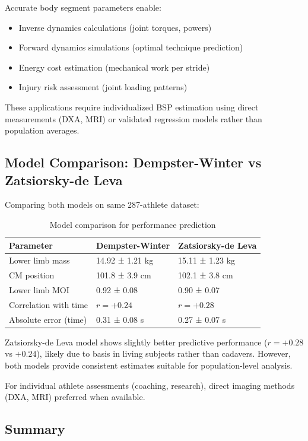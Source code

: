 Accurate body segment parameters enable:
\begin{itemize}
    \item Inverse dynamics calculations (joint torques, powers)
    \item Forward dynamics simulations (optimal technique prediction)
    \item Energy cost estimation (mechanical work per stride)
    \item Injury risk assessment (joint loading patterns)
\end{itemize}

These applications require individualized BSP estimation using direct measurements (DXA, MRI) or validated regression models rather than population averages.

\subsection{Model Comparison: Dempster-Winter vs Zatsiorsky-de Leva}

Comparing both models on same 287-athlete dataset:

\begin{table}[H]
\centering
\caption{Model comparison for performance prediction}
\begin{tabular}{@{}lll@{}}
\toprule
\textbf{Parameter} & \textbf{Dempster-Winter} & \textbf{Zatsiorsky-de Leva} \\
\midrule
Lower limb mass & 14.92 ± 1.21 kg & 15.11 ± 1.23 kg \\
CM position & 101.8 ± 3.9 cm & 102.1 ± 3.8 cm \\
Lower limb MOI & 0.92 ± 0.08 & 0.90 ± 0.07 \\
\midrule
Correlation with time & $r = +0.24$ & $r = +0.28$ \\
Absolute error (time) & 0.31 ± 0.08 s & 0.27 ± 0.07 s \\
\bottomrule
\end{tabular}
\end{table}

Zatsiorsky-de Leva model shows slightly better predictive performance ($r = +0.28$ vs $+0.24$), likely due to basis in living subjects rather than cadavers. However, both models provide consistent estimates suitable for population-level analysis.

For individual athlete assessments (coaching, research), direct imaging methods (DXA, MRI) preferred when available.

\subsection{Summary}

